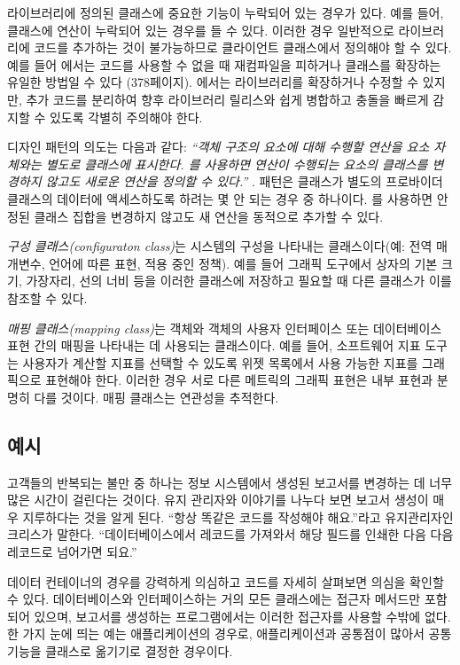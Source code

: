 \documentclass[a4paper,10pt,twoside]{book}
\begin{document}
라이브러리에 정의된 클래스에 중요한 기능이 누락되어 있는 경우가 있다. 예를 들어,  클래스에  연산이 누락되어 있는 경우를 들 수 있다. 이러한 경우 일반적으로 라이브러리에 코드를 추가하는 것이 불가능하므로 클라이언트 클래스에서 정의해야 할 수 있다. 예를 들어 에서는 코드를 사용할 수 없을 때 재컴파일을 피하거나 클래스를 확장하는 유일한 방법일 수 있다 \cite{Alpe98a} (378페이지). 에서는 라이브러리를 확장하거나 수정할 수 있지만, 추가 코드를 분리하여 향후 라이브러리 릴리스와 쉽게 병합하고 충돌을 빠르게 감지할 수 있도록 각별히 주의해야 한다. 

 디자인 패턴의 의도는 다음과 같다: \emph{``객체 구조의 요소에 대해 수행할 연산을 요소 자체와는 별도로 클래스에 표시한다. 를 사용하면 연산이 수행되는 요소의 클래스를 변경하지 않고도 새로운 연산을 정의할 수 있다.'' } \cite{Gamm95a}.  패턴은 클래스가 별도의 프로바이더 클래스의 데이터에 액세스하도록 하려는 몇 안 되는 경우 중 하나이다. 를 사용하면 안정된 클래스 집합을 변경하지 않고도 새 연산을 동적으로 추가할 수 있다. 

\emph{구성 클래스(configuraton class)}는 시스템의 구성을 나타내는 클래스이다(예: 전역 매개변수, 언어에 따른 표현, 적용 중인 정책). 예를 들어 그래픽 도구에서 상자의 기본 크기, 가장자리, 선의 너비 등을 이러한 클래스에 저장하고 필요할 때 다른 클래스가 이를 참조할 수 있다. 

\emph{매핑 클래스(mapping class)}는 객체와 객체의 사용자 인터페이스 또는 데이터베이스 표현 간의 매핑을 나타내는 데 사용되는 클래스이다. 예를 들어, 소프트웨어 지표 도구는 사용자가 계산할 지표를 선택할 수 있도록 위젯 목록에서 사용 가능한 지표를 그래픽으로 표현해야 한다. 이러한 경우 서로 다른 메트릭의 그래픽 표현은 내부 표현과 분명히 다를 것이다. 매핑 클래스는 연관성을 추적한다.

\subsection*{예시}

고객들의 반복되는 불만 중 하나는 정보 시스템에서 생성된 보고서를 변경하는 데 너무 많은 시간이 걸린다는 것이다. 유지 관리자와 이야기를 나누다 보면 보고서 생성이 매우 지루하다는 것을 알게 된다. ``항상 똑같은 코드를 작성해야 해요.''라고 유지관리자인 크리스가 말한다. ``데이터베이스에서 레코드를 가져와서 해당 필드를 인쇄한 다음 다음 레코드로 넘어가면 되요.'' 

데이터 컨테이너의 경우를 강력하게 의심하고 코드를 자세히 살펴보면 의심을 확인할 수 있다. 데이터베이스와 인터페이스하는 거의 모든 클래스에는 접근자 메서드만 포함되어 있으며, 보고서를 생성하는 프로그램에서는 이러한 접근자를 사용할 수밖에 없다. 한 가지 눈에 띄는 예는  애플리케이션의 경우로,  애플리케이션과 공통점이 많아서 공통 기능을  클래스로 옮기기로 결정한 경우이다.
\end{document}
